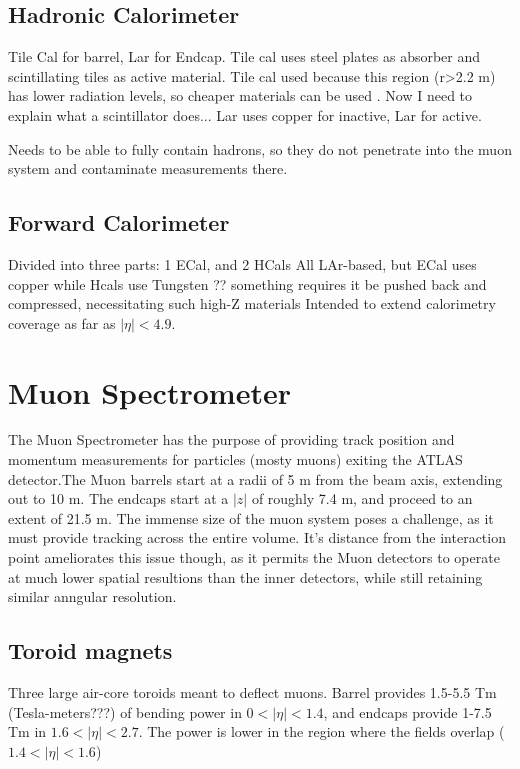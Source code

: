     \subsection{Hadronic Calorimeter}
        Tile Cal for barrel, Lar for Endcap.
        Tile cal uses steel plates as absorber and scintillating tiles as active material.
        Tile cal used because this region (r>2.2 m) has lower radiation levels, so cheaper materials can be used \cite{Lar_cal_tdr}.
        Now I need to explain what a scintillator does...
        Lar uses copper for inactive, Lar for active.

        Needs to be able to fully contain hadrons, so they do not penetrate into the muon system and contaminate measurements there.


    \subsection{Forward Calorimeter}
        Divided into three parts: 1 ECal, and 2 HCals
        All LAr-based, but ECal uses copper while Hcals use Tungsten
        ?? something requires it be pushed back and compressed, necessitating such high-Z materials
        Intended to extend calorimetry coverage as far as $|\eta| < 4.9$.



\section{Muon Spectrometer}  %
    The Muon Spectrometer has the purpose of providing track position and momentum measurements for particles (mosty muons) exiting the ATLAS detector.The Muon barrels start at a radii of 5 m from the beam axis, extending out to 10 m. The endcaps start at a $|z|$ of roughly 7.4 m, and proceed to an extent of 21.5 m. The immense size of the muon system poses a challenge, as it must provide tracking across the entire volume. It's distance from the interaction point ameliorates this issue though, as it permits the Muon detectors to operate at much lower spatial resultions than the inner detectors, while still retaining similar anngular resolution.

    \subsection{Toroid magnets}
        Three large air-core toroids meant to deflect muons.
        Barrel provides 1.5-5.5 Tm (Tesla-meters???) of bending power in $0<|\eta|<1.4$,
        and endcaps provide 1-7.5 Tm in $1.6<|\eta|<2.7$.
        The power is lower in the region where the fields overlap ($1.4<|\eta|<1.6$)

